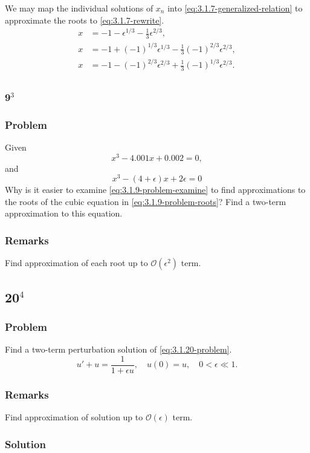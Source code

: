 \documentclass[12pt]{article}
\begin{document}
We may map the individual solutions of $x_n$ into
\cref{eq:3.1.7-generalized-relation} to approximate the roots to
\cref{eq:3.1.7-rewrite}.
\begin{equation*}
  \boxed{
    \begin{aligned}
      x &= -1 - \epsilon^{1/3} - \frac{1}{3}\epsilon^{2/3}, \\
      x &= -1 + {(-1)}^{1/3}\epsilon^{1/3} - \frac{1}{3}{(-1)}^{2/3}\epsilon^{2/3}, \\
      x &= -1 - {(-1)}^{2/3}\epsilon^{2/3} + \frac{1}{3}{(-1)}^{1/3}\epsilon^{2/3}. \\
    \end{aligned}
  }
\end{equation*}

\subsubsection{9$^3$}
\subsubsection*{Problem}
Given
\begin{equation}
  \label{eq:3.1.9-problem-roots}
  x^3-4.001x+0.002=0,
\end{equation}
and
\begin{equation}
  \label{eq:3.1.9-problem-examine}
  x^3-(4+\epsilon)x+2\epsilon=0
\end{equation}
Why is it easier to examine \cref{eq:3.1.9-problem-examine} to find
approximations to the roots of the cubic equation in
\cref{eq:3.1.9-problem-roots}? Find a two-term approximation to this equation.
\subsubsection*{Remarks}
Find approximation of each root up to $\mathcal{O}(\epsilon^2)$ term.

\subsection{20$^4$}
\subsubsection*{Problem}
Find a two-term perturbation solution of \cref{eq:3.1.20-problem}.
\begin{equation}
  \label{eq:3.1.20-problem}
  u'+u=\frac{1}{1+\epsilon u},\quad u(0)=u,\quad 0<\epsilon\ll1.
\end{equation}

\subsubsection*{Remarks}
Find approximation of solution up to $\mathcal{O}(\epsilon)$ term.

\subsubsection*{Solution}
\todo{}
\end{document}
